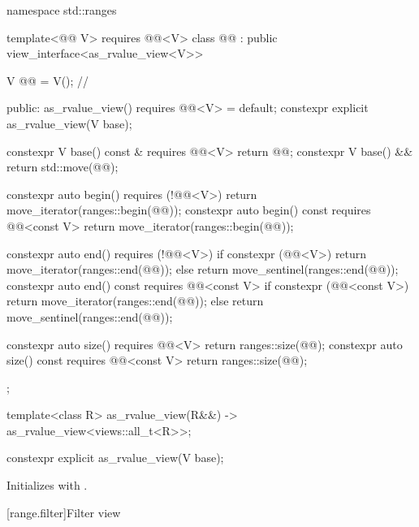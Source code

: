 \begin{codeblock}
namespace std::ranges {
  template<@@ V>
    requires @@<V>
  class @@ : public view_interface<as_rvalue_view<V>> {
    V @@ = V();      // \expos

  public:
    as_rvalue_view() requires @@<V> = default;
    constexpr explicit as_rvalue_view(V base);

    constexpr V base() const & requires @@<V> { return @@; }
    constexpr V base() && { return std::move(@@); }

    constexpr auto begin() requires (!@@<V>)
    { return move_iterator(ranges::begin(@@)); }
    constexpr auto begin() const requires @@<const V>
    { return move_iterator(ranges::begin(@@)); }

    constexpr auto end() requires (!@@<V>) {
      if constexpr (@@<V>) {
        return move_iterator(ranges::end(@@));
      } else {
        return move_sentinel(ranges::end(@@));
      }
    }
    constexpr auto end() const requires @@<const V> {
      if constexpr (@@<const V>) {
        return move_iterator(ranges::end(@@));
      } else {
        return move_sentinel(ranges::end(@@));
      }
    }

    constexpr auto size() requires @@<V> { return ranges::size(@@); }
    constexpr auto size() const requires @@<const V> { return ranges::size(@@); }
  };

  template<class R>
    as_rvalue_view(R&&) -> as_rvalue_view<views::all_t<R>>;
}
\end{codeblock}

%
\begin{itemdecl}
constexpr explicit as_rvalue_view(V base);
\end{itemdecl}

\begin{itemdescr}
\pnum
\effects
Initializes  with .
\end{itemdescr}

[range.filter]{Filter view}

